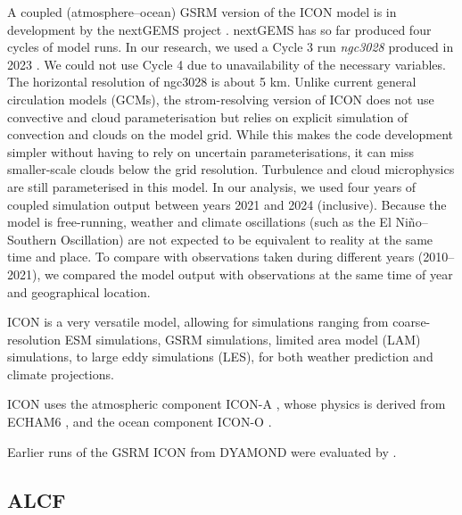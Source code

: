 \documentclass[12pt,a4paper]{article}
\begin{document}
A coupled (atmosphere--ocean) GSRM version of the ICON model is in development
by the nextGEMS project \citep{hohenegger2023}. nextGEMS has so far produced
four cycles of model runs. In our research, we used a Cycle 3 run
\emph{ngc3028} produced in 2023 \citep{nextgems2023a,nextgems2023b}. We could
not use Cycle 4 due to unavailability of the necessary variables. The
horizontal resolution of ngc3028 is about 5 km.  Unlike current general
circulation models (GCMs), the strom-resolving version of ICON does not use
convective and cloud parameterisation but relies on explicit simulation of
convection and clouds on the model grid. While this makes the code development
simpler without having to rely on uncertain parameterisations, it can miss
smaller-scale clouds below the grid resolution.  Turbulence and cloud
microphysics are still parameterised in this model. In our analysis, we used
four years of coupled simulation output between years 2021 and 2024
(inclusive). Because the model is free-running, weather and climate
oscillations (such as the El Niño--Southern Oscillation) are not expected to be
equivalent to reality at the same time and place. To compare with observations
taken during different years (2010--2021), we compared the model output with
observations at the same time of year and geographical location.

ICON is a very versatile model, allowing for simulations ranging from
coarse-resolution ESM simulations, GSRM simulations, limited area model (LAM)
simulations, to large eddy simulations (LES), for both weather prediction and
climate projections.

ICON uses the atmospheric component ICON-A \citep{giorgetta2018}, whose
physics is derived from ECHAM6 \citep{stevens2013}, and the ocean component
ICON-O \citep{korn2022}.

Earlier runs of the GSRM ICON from DYAMOND were evaluated by
\cite{mauritsen2022}.

\subsection{ALCF}
\end{document}
